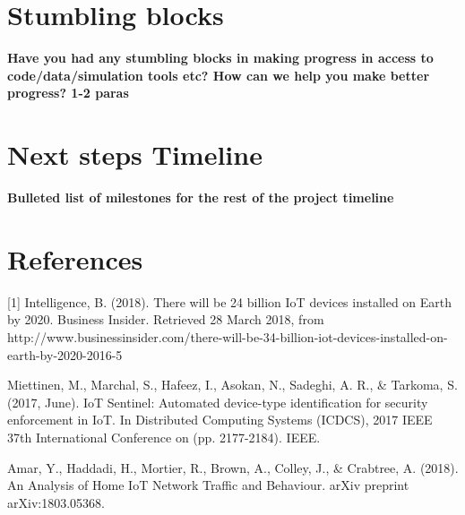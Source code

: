 \documentclass[twocolumn,10pt]{article}
\begin{document}
\section{Stumbling blocks}

{\bf Have you had any stumbling blocks in making progress in access to code/data/simulation tools etc? How can we help you make better progress? 1-2 paras}


\section{Next steps  Timeline}

{\bf Bulleted list of milestones for the rest of the project timeline}

\section{References}
[1] Intelligence, B. (2018). There will be 24 billion IoT devices installed on Earth by 2020. Business Insider. Retrieved 28 March 2018, from http://www.businessinsider.com/there-will-be-34-billion-iot-devices-installed-on-earth-by-2020-2016-5

\newline [2] Miettinen, M., Marchal, S., Hafeez, I., Asokan, N., Sadeghi, A. R., & Tarkoma, S. (2017, June). IoT Sentinel: Automated device-type identification for security enforcement in IoT. In Distributed Computing Systems (ICDCS), 2017 IEEE 37th International Conference on (pp. 2177-2184). IEEE.

\newline [3] Amar, Y., Haddadi, H., Mortier, R., Brown, A., Colley, J., & Crabtree, A. (2018). An Analysis of Home IoT Network Traffic and Behaviour. arXiv preprint arXiv:1803.05368.

{
\footnotesize
\raggedright


}

%
\end{document}
